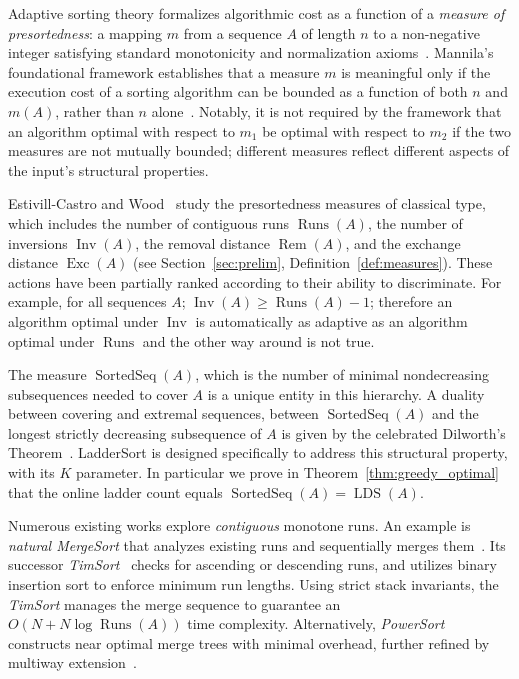 \documentclass{ieeeaccess}
\theoremstyle{plain}
\theoremstyle{definition}
\DeclareMathOperator{\Runs}{Runs}
\DeclareMathOperator{\Inv}{Inv}
\DeclareMathOperator{\Rem}{Rem}
\DeclareMathOperator{\Exc}{Exc}
\DeclareMathOperator{\SortedSeq}{SortedSeq}
\begin{document}
Adaptive sorting theory formalizes algorithmic cost as a function of a \emph{measure of presortedness}: a mapping $m$ from a sequence $A$ of length $n$ to a non-negative integer satisfying standard monotonicity and normalization axioms~\cite{Mannila1985}. Mannila's foundational framework establishes that a measure $m$ is meaningful only if the execution cost of a sorting algorithm can be bounded as a function of both $n$ and $m(A)$, rather than $n$ alone~\cite{Mannila1985}. Notably, it is not required by the framework that an algorithm optimal with respect to $m_1$ be optimal with respect to $m_2$ if the two measures are not mutually bounded; different measures reflect different aspects of the input's structural properties.


Estivill-Castro and Wood~\cite{EstivillWood1992} study the presortedness measures of classical type, which includes the number of contiguous runs $\Runs(A)$, the number of inversions $\Inv(A)$, the removal distance $\Rem(A)$, and the exchange distance $\Exc(A)$ (see Section~\ref{sec:prelim}, Definition~\ref{def:measures}). These actions have been partially ranked according to their ability to discriminate. For example, for all sequences $A$; $\Inv(A) \ge \Runs(A) - 1$; therefore an algorithm optimal under $\Inv$ is automatically as adaptive as an algorithm optimal under $\Runs$ and the other way around is not true.

The measure $\SortedSeq(A)$, which is the number of minimal nondecreasing subsequences needed to cover $A$ is a unique entity in this hierarchy. A duality between covering and extremal sequences, between $\SortedSeq(A)$ and the longest strictly decreasing subsequence of $A$ is given by the celebrated Dilworth's Theorem~\cite{Dilworth1950}. LadderSort is designed specifically to address this structural property, with its $K$ parameter. In particular we prove in Theorem~\ref{thm:greedy_optimal} that the online ladder count equals $\SortedSeq(A) = \operatorname{LDS}(A)$.

Numerous existing works explore \emph{contiguous} monotone runs. An example is \emph{natural MergeSort} that analyzes existing runs and sequentially merges them~\cite{Knuth1998}. Its successor \emph{TimSort}~\cite{Auger2018} checks for ascending or descending runs, and utilizes binary insertion sort to enforce minimum run lengths. Using strict stack invariants, the \emph{TimSort} manages the merge sequence to guarantee an $O(N + N\log\Runs(A))$ time complexity. Alternatively, \emph{PowerSort}~\cite{MunroWild2018} constructs near optimal merge trees with minimal overhead, further refined by multiway extension~\cite{GellingNebel2023}.
\end{document}
